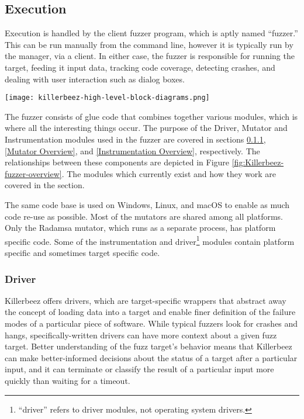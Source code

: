 \subsection{Execution}
Execution is handled by the client fuzzer program, which is aptly named ``fuzzer.''
This can be run manually from the command line, however it is typically run by
the manager, via a \BOINC{} client.  In either case, the fuzzer is responsible
for running the target, feeding it input data, tracking code
coverage, detecting crashes, and dealing with user interaction such as dialog
boxes.

\begin{figure*}[!ht]
\centering
\texttt{[image: killerbeez-high-level-block-diagrams.png]}
\caption{Killerbeez Fuzzer Overview}
\label{fig:Killerbeez-fuzzer-overview}
\end{figure*}

The fuzzer consists of glue code that combines together various
modules, which is where all the interesting things occur. The purpose of
the Driver, Mutator and Instrumentation modules used in the fuzzer are covered in sections
\ref{Driver Overview}, \ref{Mutator Overview}, and
\ref{Instrumentation Overview}, respectively.  The relationships between these components are depicted in Figure \ref{fig:Killerbeez-fuzzer-overview}. The modules which currently
exist and how they work are covered in the 
section.

The same code base is used on Windows, Linux, and macOS to enable as much code
re-use as possible.  Most of the mutators are shared among all platforms.
Only the Radamsa mutator, which runs as a separate process, has platform specific code.
Some of the instrumentation and driver\footnote{
``driver'' refers to driver modules, not operating system drivers.}
modules contain platform specific and sometimes target specific code.

\subsubsection{Driver} \label{Driver Overview}
Killerbeez offers drivers, which are target-specific wrappers that abstract
away the concept of loading data into a target and enable finer
definition of the failure modes of a particular piece of software. While
typical fuzzers look for crashes and hangs, specifically-written drivers can
have more context about a given fuzz target.  Better understanding of the fuzz
target's behavior means that Killerbeez can make better-informed decisions
about the status of a target after a particular input, and it can terminate or
classify the result of a particular input more quickly than waiting for a
timeout.

